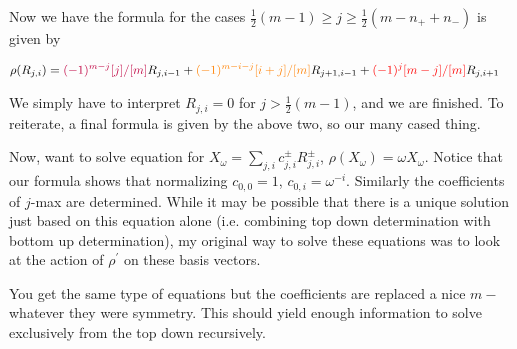\documentclass{article}
\begin{document}
Now we have the formula for the cases $\frac{1}{2}(m-1)\ge j\ge \frac{1}{2}(m-n_{+}+n_{-})$ is given by

\begin{align*}
\rho(R_{j,i}) 
&= 
\textcolor{purple}{(-1)^{m-j}[j]/[m]} R_{j,i-1}
+\textcolor{orange}{(-1)^{m-i-j} [i+j]/[m] } R_{j+1,i-1}
+\textcolor{red}{(-1)^j [m-j]/[m]} R_{j,i+1}
\end{align*}

We simply have to interpret $R_{j,i}=0$ for $j>\frac{1}{2}(m-1)$, and we are finished.  To reiterate, a final formula is given by the above two, so our many cased thing. 


Now, want to solve equation for $X_{\omega}=\sum_{j,i} c^{\pm}_{j,i}R^{\pm}_{j,i}$, $\rho(X_{\omega})=\omega X_{\omega}$.  Notice that our formula shows that normalizing $c_{0,0}=1$, $c_{0,i}=\omega^{-i}$.  Similarly the coefficients of $j$-max are determined.  While it may be possible that there is a unique solution just based on this equation alone (i.e. combining top down determination with bottom up determination), my original way to solve these equations was to look at the action of $\rho^{\prime}$ on these basis vectors.


You get the same type of equations but the coefficients are replaced a nice $m-$ whatever they were symmetry.  This should yield enough information to solve exclusively from the top down recursively. 
\end{document}
